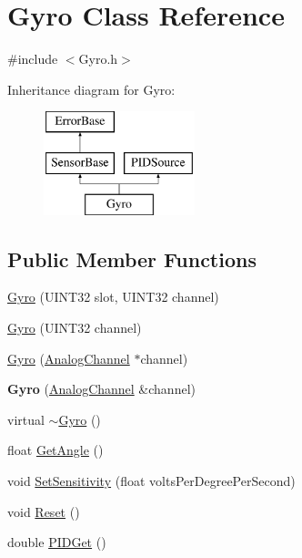 \hypertarget{classGyro}{\section{\-Gyro \-Class \-Reference}
\label{classGyro}
}


{\ttfamily \#include $<$\-Gyro.\-h$>$}

\-Inheritance diagram for \-Gyro\-:\begin{figure}[H]
\begin{center}
\leavevmode
\includegraphics[height=3.000000cm]{classGyro}
\end{center}
\end{figure}
\subsection*{\-Public \-Member \-Functions}
\begin{DoxyCompactItemize}
\item 
\hyperlink{classGyro_a11be27574819cf977af46381e5dd0977}{\-Gyro} (\-U\-I\-N\-T32 slot, \-U\-I\-N\-T32 channel)
\item 
\hyperlink{classGyro_afc23fe3ba40c495d1b3a0e10c5abec30}{\-Gyro} (\-U\-I\-N\-T32 channel)
\item 
\hyperlink{classGyro_ae90174929eaabecb8e1214a0a252ae60}{\-Gyro} (\hyperlink{classAnalogChannel}{\-Analog\-Channel} $\ast$channel)
\item 
\hypertarget{classGyro_abaedf2b4b315a9e9f26eb9e515f70fb6}{{\bfseries \-Gyro} (\hyperlink{classAnalogChannel}{\-Analog\-Channel} \&channel)}\label{classGyro_abaedf2b4b315a9e9f26eb9e515f70fb6}

\item 
virtual \hyperlink{classGyro_af58b57914897b22014110908326eace2}{$\sim$\-Gyro} ()
\item 
float \hyperlink{classGyro_a37c29b42b58b90fe1ed11f04c2635d4f}{\-Get\-Angle} ()
\item 
void \hyperlink{classGyro_aaf5c11137c5428c427b2a2162cd43f09}{\-Set\-Sensitivity} (float volts\-Per\-Degree\-Per\-Second)
\item 
void \hyperlink{classGyro_ae13fc1c339cb0267740b86c0585ceac7}{\-Reset} ()
\item 
double \hyperlink{classGyro_aca619c0201c5fb85e2bbaeef0f39e8e6}{\-P\-I\-D\-Get} ()
\end{DoxyCompactItemize}
